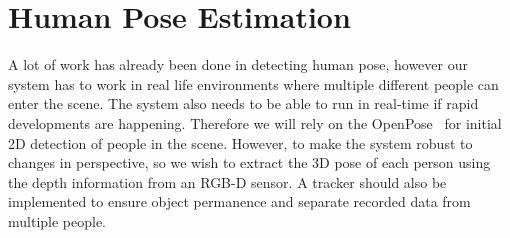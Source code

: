 \section{Human Pose Estimation}

A lot of work has already been done in detecting human pose, however our system has to work in real life environments where multiple different people can enter the scene. The system also needs to be able to run in real-time if rapid developments are happening. Therefore we will rely on the OpenPose~\cite{cao2017realtime} for initial 2D detection of people in the scene. However, to make the system robust to changes in perspective, so we wish to extract the 3D pose of each person using the depth information from an RGB-D sensor.
A tracker should also be implemented to ensure object permanence and separate recorded data from multiple people.

